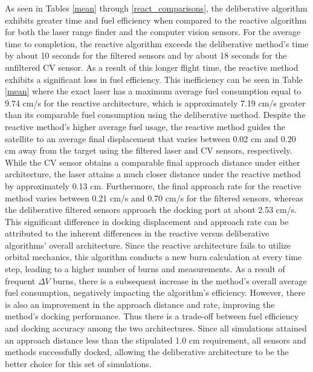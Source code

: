 \documentclass[journal, 10pt]{IEEEtran}
\begin{document}
As seen in Tables \ref{mean} through \ref{react_comparisons}, the deliberative algorithm exhibits greater time and fuel efficiency when compared to the reactive algorithm for both the laser range finder and the computer vision sensors. For the average time to completion, the reactive algorithm exceeds the deliberative method's time by about 10 seconds for the filtered sensors and by about 18 seconds for the unfiltered CV sensor. As a result of this longer flight time, the reactive method exhibits a significant loss in fuel efficiency. This inefficiency can be seen in Table \ref{mean} where the exact laser has a maximum average fuel consumption equal to 9.74 cm/s for the reactive architecture, which is approximately 7.19 cm/s greater than its comparable fuel consumption using the deliberative method. Despite the reactive method's higher average fuel usage, the reactive method guides the satellite to an average final displacement that varies between 0.02 cm and 0.20 cm away from the target using the filtered laser and CV sensors, respectively. While the CV sensor obtains a comparable final approach distance under either architecture, the laser attains a much closer distance under the reactive method by approximately 0.13 cm. Furthermore, the final approach rate for the reactive method varies between 0.21 cm/s and 0.70 cm/s for the filtered sensors, whereas the deliberative filtered sensors approach the docking port at about 2.53 cm/s. This significant difference in docking displacement and approach rate can be attributed to the inherent differences in the reactive versus deliberative algorithms' overall architecture. Since the reactive architecture fails to utilize orbital mechanics, this algorithm conducts a new burn calculation at every time step, leading to a higher number of burns and measurements. As a result of frequent $\Delta V$ burns, there is a subsequent increase in the method's overall average fuel consumption, negatively impacting the algorithm's efficiency. However, there is also an improvement in the approach distance and rate, improving the method's docking performance. Thus there is a trade-off between fuel efficiency and docking accuracy among the two architectures. Since all simulations attained an approach distance less than the stipulated 1.0 cm requirement, all sensors and methods successfully docked, allowing the deliberative architecture to be the better choice for this set of simulations.
\end{document}

